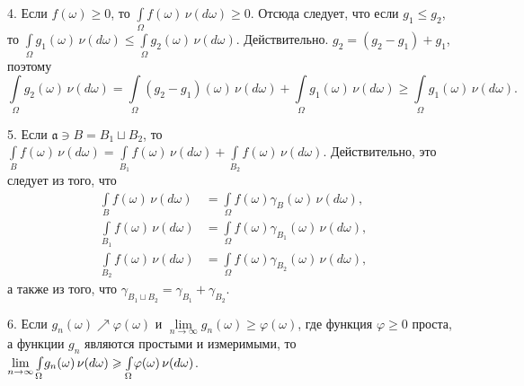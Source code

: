 \documentclass[12pt,titlepage]{article}
\theoremstyle{definition}
\newcommand*{\p}[1]{#1\nobreak\discretionary{}{\hbox{$\mathsurround=0pt #1$}}{}}
\begin{document}
4. Если $f(\omega)\geqslant 0$, то $\int\limits_\Omega\!
f(\omega)\,\nu(d\omega)\geqslant 0$. Отсюда следует, что если
$g_1\leqslant g_2$, то $\int\limits_\Omega\!
g_1(\omega)\,\nu(d\omega)\leqslant\int\limits_\Omega\!
g_2(\omega)\,\nu(d\omega)$. Действительно. $g_2=(g_2-g_1)+g_1$,
поэтому $$\int\limits_\Omega\!
g_2(\omega)\,\nu(d\omega)=\int\limits_\Omega\!
(g_2-g_1)(\omega)\,\nu(d\omega)+\int\limits_\Omega\!
g_1(\omega)\,\nu(d\omega)\geqslant \int\limits_\Omega\!
g_1(\omega)\,\nu(d\omega).$$

5. Если $\mathfrak{a}\ni B=B_1\sqcup B_2$, то $\int\limits_B\!
f(\omega)\,\nu(d\omega)=\int\limits_{B_1}\!
f(\omega)\,\nu(d\omega)+\int\limits_{B_2}\!
f(\omega)\,\nu(d\omega)$. Действительно, это следует из того, что
\begin{align*}
\int\limits_B\! f(\omega)\,\nu(d\omega)&=\int\limits_\Omega\!
f(\omega)\gamma_B(\omega)\,\nu(d\omega), \\
\int\limits_{B_1}\! f(\omega)\,\nu(d\omega)&=\int\limits_\Omega\!
f(\omega)\gamma_{B_1}(\omega)\,\nu(d\omega), \\
\int\limits_{B_2}\! f(\omega)\,\nu(d\omega)&=\int\limits_\Omega\!
f(\omega)\gamma_{B_2}(\omega)\,\nu(d\omega),
\end{align*}
а также из того, что $\gamma_{B_1\sqcup
B_2}=\gamma_{B_1}+\gamma_{B_2}$.

6. Если $g_n(\omega)\nearrow \varphi(\omega)$ и
$\lim\limits_{n\to\infty}g_n(\omega)\geqslant \varphi(\omega)$, где
функция $\varphi\geqslant 0$ проста, а функции $g_n$ являются
простыми и измеримыми, то
$\lim\limits_{n\to\infty}\int\limits_\Omega\!
g_n(\omega)\,\nu(d\omega)\p\geqslant \int\limits_\Omega\!
\varphi(\omega)\,\nu(d\omega)$.
\end{document}
